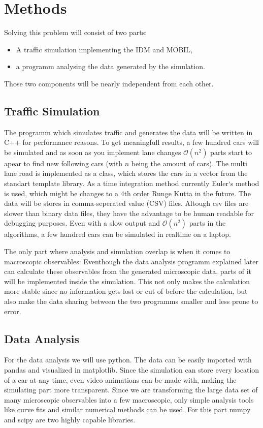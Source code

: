 \section{Methods}
\label{sec:methods}
Solving this problem will consist of two parts: 
\begin{itemize}
  \item A traffic simulation implementing the IDM and MOBIL,
  \item a programm analysing the data generated by the simulation.
\end{itemize}
Those two components will be nearly independent from each other.

\subsection{Traffic Simulation}
\label{sec:traffic_simulation}
The programm which simulates traffic and generates the data will be written in C++ for performance reasons. To get
meaningfull results, a few hundred cars will be simulated and as soon as you implement lane changes $\mathcal{O}(n^2)$
parts start to apear to find new following cars (with $n$ being the amount of cars). The multi lane road is implemented
as a class, which stores the cars in a vector from the standart template library. As a time integration method currently
Euler`s method is used, which might be changes to a 4th order Runge Kutta in the future. The data will be stores in
comma-seperated value (CSV) files. Altough csv files are slower than binary data files, they have the advantage to be
human readable for debugging purposes. Even with a slow output and $\mathcal{O}(n^2)$ parts in the algorithms,
a few hundred cars can be simulated in realtime on a laptop. 

The only part where analysis and simulation overlap is when it comes to macroscopic observables: Eventhough the data 
analysis programm explained later can calculate these observables from the generated microscopic data, parts of it will
be implemented inside the simulation. This not only makes the calculation more stable since no information gets lost or
cut of before the calculation, but also make the data sharing between the two programms smaller and less prone to error.

\subsection{Data Analysis}
\label{sec:data_analysis}
For the data analysis we will use python. The data can be easily imported with pandas and visualized in matplotlib.
Since the simulation can store every location of a car at any time, even video animations can be made with, making the
simulating part more transparent. Since we are transforming the large data set of many microscopic observables into a
few macroscopic, only simple analysis tools like curve fits and similar numerical methods can be used. For this part
numpy and scipy are two highly capable libraries.

